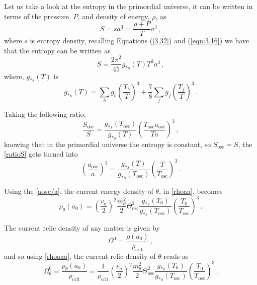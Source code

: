 Let us take a look at the entropy in the primordial universe, it can be written in terms of the pressure, $P$, and density of energy, $\rho$, as
\begin{equation}
    S=sa^3=\dfrac{\rho+P}{T}a^3\,,
\end{equation}
where $s$ is entropy density, recalling Equations (\ref{3.32}) and (\ref{eqn:3.16}) we have that the entropy can be written as
\begin{equation}
    S=\dfrac{2\pi^2}{45}g_{*s}(T)T^3a^3\,,
\end{equation}
where, $g_{*s}(T)$ is
\begin{equation}
	g_{*s}(T)=\sum\limits_{b}g_b\left(\frac{T_b}{T}\right)^3+\dfrac{7}{8}\sum\limits_{f}g_f\left(\frac{T_f}{T}\right)^3\,.
\end{equation}

Taking the following ratio,
\begin{equation}
\label{ratioS}
    \dfrac{S_\textrm{osc}}{S}=\dfrac{g_{*s}(T_\textrm{osc})}{g_{*s}(T)}\left(\dfrac{T_\textrm{osc}a_\textrm{osc}}{Ta}\right)^3\,,
\end{equation}
knowing that in the primordial universe the entropy is constant, so $S_\textrm{osc}=S$, the \autoref{ratioS} gets turned into
\begin{equation}
\label{aosc/a}
       \left(\dfrac{a_\textrm{osc}}{a}\right)^3=\dfrac{g_{*s}(T)}{g_{*s}(T_\textrm{osc})}\left(\dfrac{T}{T_\textrm{osc}}\right)^3\,.
\end{equation}

Using the \autoref{aosc/a}, the current energy density of $\theta$, in \autoref{rhoaa}, becomes
\begin{equation}
    \label{rhoaaa}
    \rho_\theta(a_0)=\left(\dfrac{v_\sigma}{2}\right)^2\dfrac{m_\theta^2}{2}\Theta_\textrm{osc}^2\dfrac{g_{*s}(T_0)}{g_{*s}(T_\textrm{osc})}\left(\dfrac{T_0}{T_\textrm{osc}}\right)^3\,.
\end{equation}
 
The current relic density of any matter is given by
\begin{equation}
    \Omega^0=\dfrac{\rho(a_0)}{\rho_\textrm{crit}}\,,
\end{equation}
and so using \autoref{rhoaaa}, the current relic density of $\theta$ reads as
\begin{equation}
    \Omega^0_\theta=\dfrac{\rho_\theta(a_0)}{\rho_\textrm{crit}}=\frac{1}{\rho_\textrm{crit}}\left(\dfrac{v_\sigma}{2}\right)^2\dfrac{m_\theta^2}{2}\Theta_\textrm{osc}^2\dfrac{g_{*s}(T_0)}{g_{*s}(T_\textrm{osc})}\left(\dfrac{T_0}{T_\textrm{osc}}\right)^3\,.
\end{equation}

